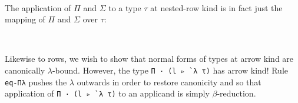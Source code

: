 \documentclass[authoryear, acmsmall, screen, review, nonacm]{acmart}
\begin{document}
\begin{code}%
%
\>[2]\AgdaSpace{}%
\AgdaSymbol{:}\AgdaSpace{}%
\AgdaSpace{}%
\AgdaSymbol{\{}\AgdaSymbol{\}}\AgdaSpace{}%
\AgdaSymbol{\{}\AgdaSpace{}%
\AgdaSymbol{:}\AgdaSpace{}%
\AgdaSpace{}%
\AgdaSpace{}%
\AgdaOperator{\AgdaInductiveConstructor{R[}}\AgdaSpace{}%
\AgdaSpace{}%
\AgdaOperator{\AgdaInductiveConstructor{]}}\AgdaSymbol{\}}\AgdaSpace{}%
\<%
\\
\>[2][@{}l@{\AgdaIndent{0}}]%
\>[4]\AgdaSpace{}%
\AgdaSpace{}%
\AgdaSymbol{(}\AgdaSpace{}%
\AgdaSpace{}%
\AgdaSymbol{)}\AgdaSpace{}%
\AgdaSpace{}%
\AgdaSymbol{(}\AgdaSpace{}%
\AgdaSpace{}%
\AgdaSymbol{(}\AgdaSpace{}%
\AgdaSpace{}%
\AgdaSymbol{))}\<%
\end{code}

\Ni The application of $\Pi$ and $\Sigma$ to a type $\tau$ at nested-row kind is in fact just the mapping of $\Pi$ and $\Sigma$ over $\tau$:

\begin{code}%
%
\>[2]\AgdaSpace{}%
\AgdaSymbol{:}\AgdaSpace{}%
\AgdaSpace{}%
\AgdaSymbol{\{}\AgdaSpace{}%
\AgdaSymbol{:}\AgdaSpace{}%
\AgdaSpace{}%
\AgdaSpace{}%
\AgdaOperator{\AgdaInductiveConstructor{R[}}\AgdaSpace{}%
\AgdaOperator{\AgdaInductiveConstructor{R[}}\AgdaSpace{}%
\AgdaSpace{}%
\AgdaOperator{\AgdaInductiveConstructor{]}}\AgdaSpace{}%
\AgdaOperator{\AgdaInductiveConstructor{]}}\AgdaSymbol{\}}\AgdaSpace{}%
\<%
\\
\>[2][@{}l@{\AgdaIndent{0}}]%
\>[4]\AgdaSpace{}%
\AgdaSpace{}%
\AgdaSpace{}%
\AgdaSpace{}%
\AgdaSpace{}%
\AgdaOperator{\AgdaInductiveConstructor{<\$>}}\AgdaSpace{}%
\<%
\end{code}

Likewise to rows, we wish to show that normal forms of types at arrow kind are canonically $\lambda$-bound. However, the type \verb!Π · (l ▹ `λ τ)! has arrow kind! Rule \verb!eq-Πλ! pushes the $\lambda$ outwards in order to restore canonicity and so that application of \verb!Π · (l ▹ `λ τ)! to an applicand is simply $\beta$-reduction.
\end{document}
